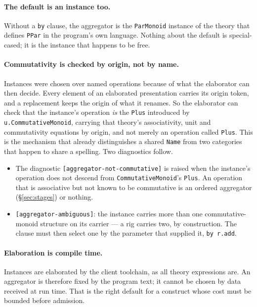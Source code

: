 \documentclass[11pt]{article}
\theoremstyle{branddef}
\theoremstyle{brandplain}
\theoremstyle{brandrem}
\begin{document}
\paragraph{The default is an instance too.} Without a \texttt{by} clause, the
aggregator is the \texttt{ParMonoid} instance of the theory that defines
\texttt{PPar} in the program's own language. Nothing about the default is
special-cased; it is the instance that happens to be free.

\paragraph{Commutativity is checked by origin, not by name.} Instances were
chosen over named operations because of what the elaborator can then decide.
Every element of an elaborated presentation carries its origin token, and a
replacement keeps the origin of what it renames. So the elaborator can check
that the instance's operation \emph{is} the \texttt{Plus} introduced by
\texttt{u.CommutativeMonoid}, carrying that theory's associativity, unit and
commutativity equations by origin, and not merely an operation called
\texttt{Plus}. This is the mechanism that already distinguishes a shared
\texttt{Name} from two categories that happen to share a spelling. Two
diagnostics follow.
\begin{itemize}[nosep]
\item The diagnostic \texttt{[aggregator-not-commutative]} is raised when the
instance's operation does not descend from \texttt{CommutativeMonoid}'s \texttt{Plus}. An operation that is
associative but not known to be commutative is an ordered aggregator
(\S\ref{sec:stages}) or nothing.
\item \texttt{[aggregator-ambiguous]}: the instance carries more than one
commutative-monoid structure on its carrier --- a rig carries two, by
construction. The clause must then select one by the parameter that supplied it,
\texttt{by r.add}.
\end{itemize}

\paragraph{Elaboration is compile time.} Instances are elaborated by the client
toolchain, as all theory expressions are. An aggregator is therefore fixed by
the program text; it cannot be chosen by data received at run time. That is the
right default for a construct whose cost must be bounded before admission.
\end{document}

